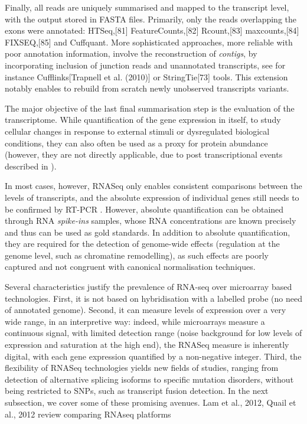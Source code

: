 \begin{enumerate}[label=(\roman*)]
    Finally, all reads are uniquely summarised and mapped to the transcript level, with the output stored in FASTA files. Primarily, only the reads overlapping the exons were annotated: HTSeq,[81] FeatureCounts,[82] Rcount,[83] maxcounts,[84] FIXSEQ,[85] and Cuffquant. More sophisticated approaches, more reliable with poor annotation information, involve the reconstruction of \textit{contigs}, by incorporating inclusion of junction reads and unannotated transcripts, see for instance Cufflinks[Trapnell et al. (2010)] or StringTie[73] tools. This extension notably enables to rebuild from scratch newly unobserved transcripts variants. 
\end{enumerate}

The major objective of the last final summarisation step is the evaluation of the transcriptome. While quantification of the gene expression in itself, to study cellular changes in response to external stimuli or dysregulated biological conditions, they can also often be used as a proxy for protein abundance (however, they are not directly applicable, due to post transcriptional events described in ). 

In most cases, however, RNASeq only enables consistent comparisons between the levels of transcripts, and the absolute expression of individual genes still needs to be confirmed by RT-PCR . However, absolute quantification can be obtained through RNA \textit{spike-ins} samples, whose RNA concentrations are known precisely and thus can be used as gold standards. In addition to absolute quantification, they are required for the detection of genome-wide effects (regulation at the genome level, such as chromatine remodelling), as such effects are poorly captured and not congruent with canonical normalisation techniques.

Several characteristics justify the prevalence of RNA-seq over microarray based technologies. First, it is not based on hybridisation with a labelled probe (no need of annotated genome). Second, it can measure levels of expression over a very wide range, in an interpretive way: indeed, while microarrays measure a continuous signal, with limited detection range (noise background for low levels of expression and saturation at the high end), the RNASeq measure is inherently digital, with each gene expression quantified by a non-negative integer. Third, the flexibility of RNASeq technologies yields new fields of studies, ranging from detection of alternative splicing isoforms to specific mutation disorders, without being restricted to SNPs, such as transcript fusion detection. In the next subsection, we cover some of these promising avenues. 
Lam et al., 2012, Quail et al., 2012 review comparing RNAseq platforms

